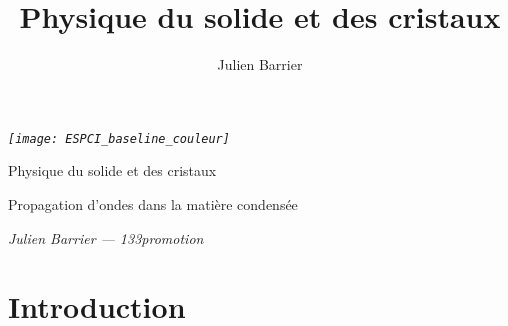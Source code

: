 \documentclass[a4paper,justified,twoside,nobib]{tufte-book}
\title{Physique du solide et des cristaux}
\author[Julien Barrier]{Julien Barrier}
\newcommand{\thetitle}{Physique du solide et des cristaux}
\newcommand{\theauthor}{Julien Barrier --- 133\ieme promotion}
\newcommand{\thesubtitle}{Propagation d'ondes dans la matière condensée}
\newcommand{\pc}{l'\textit{ESPCI Paris}\xspace}
\renewcommand{\=}[1]{\stackrel{#1}{=}} %
\begin{document}
\frontmatter

\thispagestyle{empty}
\begin{fullwidth}
\setlength{\parindent}{0pt}

\begin{center}\fontsize{24}{24}\selectfont\textit{\texttt{[image: ESPCI\_baseline\_couleur]}}
\end{center}

\vspace{3in}\fontsize{32.1}{54}\selectfont\thetitle

\vspace{0.125in}\fontsize{18}{18}\selectfont\thesubtitle

\vfill\fontsize{14}{14}\selectfont\textit{\theauthor}
\end{fullwidth}

\newpage


\cleardoublepage
\chapter*{Introduction}

\end{document}
